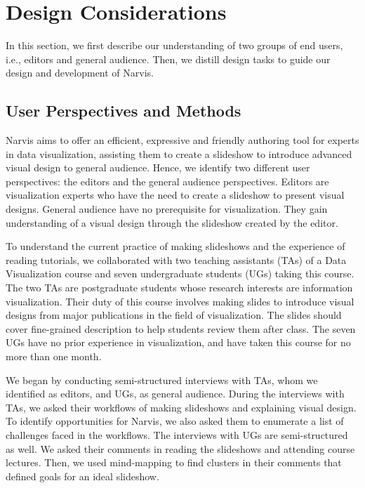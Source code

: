 \section{Design Considerations}
In this section, we first describe our understanding of two groups of end users, i.e., editors and general audience. Then, we distill design tasks to guide our design and development of Narvis.

\subsection{User Perspectives and Methods}

Narvis aims to offer an efficient, expressive and friendly authoring tool for experts in data visualization, assisting them to create a slideshow to introduce advanced visual design to general audience.  
Hence, we identify two different user perspectives: the editors and the general audience perspectives. Editors are visualization experts who have the need to create a slideshow to present visual designs. General audience have no prerequisite for visualization. They gain understanding of a visual design through the slideshow created by the editor. 

To understand the current practice of making slideshows and the experience of reading tutorials, we collaborated with two teaching assistants (TAs) of a Data Visualization course and seven undergraduate students (UGs) taking this course. The two TAs are postgraduate students whose research interests are information visualization. Their duty of this course involves making slides to introduce visual designs from major publications in the field of visualization. The slides should cover fine-grained description to help students review them after class. The seven UGs have no prior experience in visualization, and have taken this course for no more than one month.  

We began by conducting semi-structured interviews with TAs, whom we identified as editors, and UGs, as general audience. During the interviews with TAs, we asked their workflows of making slideshows and explaining visual design. To identify opportunities for Narvis, we also asked them to enumerate a list of challenges faced in the workflows. The interviews with UGs are semi-structured as well. We asked their comments in reading the slideshows and attending course lectures. Then, we used mind-mapping to find clusters in their comments that defined goals for an ideal slideshow. 


